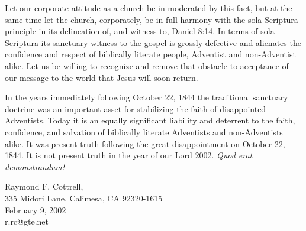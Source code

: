 Let our corporate attitude as a church be in moderated by this fact, but at
the same time let the church, corporately, be in full harmony with the sola
Scriptura principle in its delineation of, and witness to, Daniel 8:14. In
terms of sola Scriptura its sanctuary witness to the gospel is grossly
defective and alienates the confidence and respect of biblically literate
people, Adventist and non-Adventist alike. Let us be willing to recognize
and remove that obstacle to acceptance of our message to the world that
Jesus will soon return.

In the years immediately following October 22, 1844 the traditional
sanctuary doctrine was an important asset for stabilizing the faith of
disappointed Adventists. Today it is an equally significant liability and
deterrent to the faith, confidence, and salvation of biblically literate
Adventists and non-Adventists alike. It was present truth following the
great disappointment on October 22, 1844. It is not present truth in the
year of our Lord 2002. \textit{Quod erat demonstrandum!}

\vspace{1 cm}

\noindent Raymond F. Cottrell, \\
335 Midori Lane, Calimesa, CA 92320-1615 \\
February 9, 2002 \\
r.rc@gte.net \\

